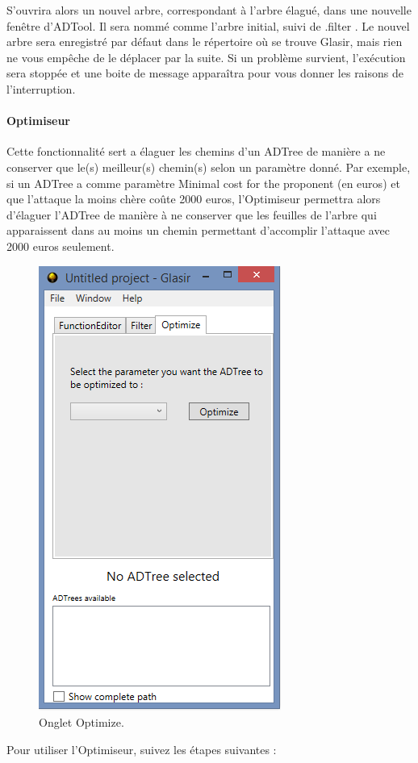 S'ouvrira alors un nouvel arbre, correspondant à l'arbre élagué, dans une nouvelle fenêtre d'ADTool. Il sera nommé comme l'arbre initial, suivi de \og .filter \fg{}. Le nouvel arbre sera enregistré par défaut dans le répertoire où se trouve Glasir, mais rien ne vous empêche de le déplacer par la suite.
Si un problème survient, l'exécution sera stoppée et une boite de message apparaîtra pour vous donner les raisons de l'interruption.



\paragraph{Optimiseur} Cette fonctionnalité sert a élaguer les chemins d'un ADTree de manière a ne conserver que le(s) meilleur(s) chemin(s) selon un paramètre donné. Par exemple, si un ADTree a comme paramètre \og Minimal cost for the proponent \fg (en euros) et que l'attaque la moins chère coûte 2000 euros, l'Optimiseur permettra alors d'élaguer l'ADTree de manière à ne conserver que les feuilles de l'arbre qui apparaissent dans au moins un chemin permettant d'accomplir l'attaque avec 2000 euros seulement.

 \begin{figure}[H]
        \centering
        \includegraphics[height=0.7\textwidth]{figure/optimizer.png}
        \caption{Onglet Optimize.}
        \label{fig:opti}
    \end{figure}

Pour utiliser l'Optimiseur, suivez les étapes suivantes :

